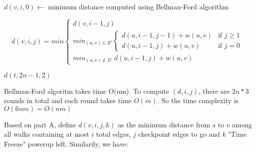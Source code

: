 \documentclass[12pt,a4paper]{article}
\newcommand{\question}[1]{\bigskip\noindent{\textbf{Q{#1} solution}}}
\begin{document}
\begin{algorithm}
	\begin{algorithmic}
		\State $d(v,i,0) \gets$ minimum distance computed using Bellman-Ford algorithm
		\EndFor

		\begin{equation*}
			d(v,i,j) = min
			\begin{cases}
				d(v,i - 1,j)                                      \\
				min_{(u,v) \in E'}
				\begin{cases}
					d(u, i - 1, j - 1) + w(u,v) & \mbox{if $j \ge 1$} \\
					d(u, i - 1, j) + w(u,v)     & \mbox{if $j = 0$}
				\end{cases} \\
				min_{(u,v) \notin E'}\ d(u, i - 1, j) + w(u,v)
			\end{cases}
		\end{equation*}
		\EndFor
		\EndFor
		\EndFor

		\Return $d(t,2n - 1, 2)$
		\EndFunction
	\end{algorithmic}
\end{algorithm}

Bellman-Ford algoritm takes time O(nm). To compute $(d,i,j)$, there are $2n * 3$ rounds in total and each round takes time $O(m)$. So the time complexity is $O(6nm) = O(nm)$

\question{25.B}

Based on part A, define $d(v,i,j,k)$ as the minimum distance from $s$ to $v$ among all walks containing at most $i$ total edges, $j$ checkpoint edges to go and $k$ "Time Freeze" powerup left. Similarily, we have:
\end{document}
